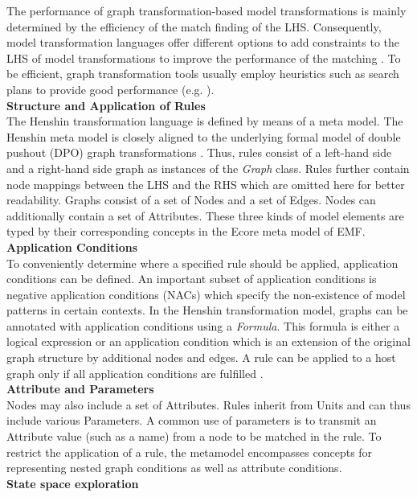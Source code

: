 The performance of graph transformation-based model transformations is mainly determined by the eﬃciency of the match ﬁnding of the LHS. Consequently, model transformation languages oﬀer diﬀerent options to add constraints to the LHS of model transformations to improve the performance of the matching \cite{tichy2013detecting}. To be eﬃcient, graph transformation tools usually employ heuristics such as search plans to provide good performance (e.g. \cite{varro2012algorithm}).\\ 
\textbf{Structure and Application of Rules}\\ 
The Henshin transformation language is deﬁned by means of a meta model. The Henshin meta model is closely aligned to the underlying formal model of double pushout (DPO) graph transformations \cite{tichy2013detecting}. Thus, rules consist of a left-hand side and a right-hand side graph as instances of the \emph{Graph} class. Rules further contain node mappings between the LHS and the RHS which are omitted here for better readability. Graphs consist of a set of Nodes and a set of Edges. Nodes can additionally contain a set of Attributes. These three kinds of model elements are typed by their corresponding concepts in the Ecore meta model of EMF.\\ 
\textbf{Application Conditions}\\ 
To conveniently determine where a speciﬁed rule should be applied, application conditions can be deﬁned. An important subset of application conditions is negative application conditions (NACs) which specify the non-existence of model patterns in certain contexts.
In the Henshin transformation model, graphs can be annotated with application conditions using a \emph{Formula}. This formula is either a logical expression or an application condition which is an extension of the original graph structure by additional nodes and edges. A rule can be applied to a host graph only if all application conditions are fulﬁlled \cite{arendt2010henshin}.\\
\textbf{Attribute and Parameters}\\ 
Nodes may also include a set of Attributes. Rules inherit from Units and can thus include various Parameters. A common use of parameters is to transmit an Attribute value (such as a name) from a node to be matched in the rule. To restrict the application of a rule, the metamodel encompasses concepts for representing nested graph conditions \cite{habel2009correctness} as well as attribute conditions.\\ 
\textbf{State space exploration}\\ 
